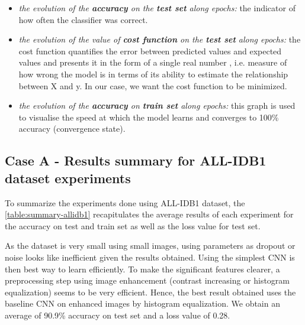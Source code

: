 \documentclass[11pt, openany]{report}
\theoremstyle{plain}
\theoremstyle{definition}
\theoremstyle{remark}
\begin{document}
\begin{itemize}
\item \textit{the evolution of the \textbf{accuracy} on the \textbf{test set} along epochs:} the indicator of how often the classifier was correct. 
\item \textit{the evolution of the value of \textbf{cost function} on the \textbf{test set} along epochs:} the cost function quantifies the error between predicted values and expected values and presents it in the form of a single real number \cite{TDS-CostFunction}, i.e. measure of how wrong the model is in terms of its ability to estimate the relationship between X and y. In our case, we want the cost function to be minimized.  
\item \textit{the evolution of the \textbf{accuracy} on \textbf{train set} along epochs:} this graph is used to visualise the speed at which the model learns and converges to 100\% accuracy (convergence state). 
\end{itemize}

\newpage
\subsection{Case A - Results summary for ALL-IDB1 dataset experiments}


\vspace{0.5cm}

To summarize the experiments done using ALL-IDB1 dataset, the \autoref{table:summary-allidb1} recapitulates the average results of each experiment for the accuracy on test and train set as well as the loss value for test set. 

As the dataset is very small using small images, using parameters as dropout or noise looks like inefficient given the results obtained. Using the simplest CNN is then best way to learn efficiently. To make the significant features clearer, a preprocessing step using image enhancement (contrast increasing or histogram equalization) seems to be very efficient. Hence, the best result obtained uses the baseline CNN on enhanced images by histogram equalization. We obtain an average of 90.9\% accuracy on test set and a loss value of 0.28. 
\end{document}
